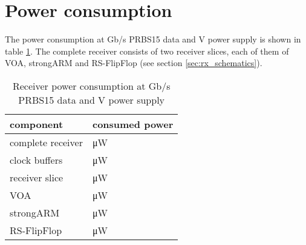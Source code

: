 \section{Power consumption}
The power consumption at \unit[10]{Gb/s} PRBS15 data and \unit[1]{V} power supply is shown in table \ref{tab:power_consumption}. The complete receiver consists of two receiver slices, each of them of VOA, strongARM and RS-FlipFlop (see section \ref{sec:rx_schematics}).

\begin{table}[H]
  \centering
  \begin{tabular}{l|l}
    component & consumed power\\
    \hline
    complete receiver & \unit[2104]{\uW}\\
    clock buffers & \unit[1814]{\uW}\\
    receiver slice & \unit[136,3]{\uW}\\
    VOA & \unit[32,58]{\uW}\\
    strongARM & \unit[46,07]{\uW}\\
    RS-FlipFlop & \unit[57,66]{\uW}\\
  \end{tabular}
  \caption{Receiver power consumption at \unit[10]{Gb/s} PRBS15 data and \unit[1]{V} power supply}
  \label{tab:power_consumption}
\end{table}